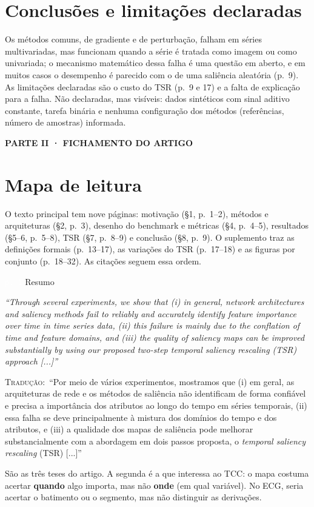 \documentclass[11pt,a4paper]{article}
\newcommand{\pagechip}[1]{{\setlength{\fboxsep}{1.5pt}\colorbox{cAcc}{\textcolor{white}{\scriptsize\texttt{#1}}}}}
\newcommand{\partbar}[1]{\par\vspace{1.2em}\noindent\colorbox{black!80}{\parbox{\dimexpr\linewidth-2\fboxsep}{\color{white}\bfseries\sffamily\MakeUppercase{#1}}}\par\vspace{0.4em}}
\newenvironment{origquote}{\par\itshape\small}{\par}
\newenvironment{tradquote}{\par\small\textsc{Tradução:}\ }{\par}
\newcommand{\explab}[1]{\par\smallskip{\small\color{cAcc}\textbf{\MakeUppercase{#1}}}\par}
\begin{document}
\section{Conclusões e limitações declaradas}
Os métodos comuns, de gradiente e de perturbação, falham em séries multivariadas, mas funcionam quando a série é tratada como imagem ou como univariada; o mecanismo matemático dessa falha é uma questão em aberto, e em muitos casos o desempenho é parecido com o de uma saliência aleatória (p.~9). As limitações declaradas são o custo do TSR (p.~9 e 17) e a falta de explicação para a falha. Não declaradas, mas visíveis: dados sintéticos com sinal aditivo constante, tarefa binária e nenhuma configuração dos métodos (referências, número de amostras) informada.

\partbar{Parte II · Fichamento do artigo}

\section{Mapa de leitura}
O texto principal tem nove páginas: motivação (§1, p.~1--2), métodos e arquiteturas (§2, p.~3), desenho do benchmark e métricas (§4, p.~4--5), resultados (§5--6, p.~5--8), TSR (§7, p.~8--9) e conclusão (§8, p.~9). O suplemento traz as definições formais (p.~13--17), as variações do TSR (p.~17--18) e as figuras por conjunto (p.~18--32). As citações seguem essa ordem.

\begin{citacard}{\pagechip{p. 1} Resumo}
\begin{origquote}“Through several experiments, we show that (i) in general, network architectures and saliency methods fail to reliably and accurately identify feature importance over time in time series data, (ii) this failure is mainly due to the conflation of time and feature domains, and (iii) the quality of saliency maps can be improved substantially by using our proposed two-step temporal saliency rescaling (TSR) approach [...]”\end{origquote}
\begin{tradquote}“Por meio de vários experimentos, mostramos que (i) em geral, as arquiteturas de rede e os métodos de saliência não identificam de forma confiável e precisa a importância dos atributos ao longo do tempo em séries temporais, (ii) essa falha se deve principalmente à mistura dos domínios do tempo e dos atributos, e (iii) a qualidade dos mapas de saliência pode melhorar substancialmente com a abordagem em dois passos proposta, o \textit{temporal saliency rescaling} (TSR) [...]”\end{tradquote}
\explab{Explicação}
São as três teses do artigo. A segunda é a que interessa ao TCC: o mapa costuma acertar \textbf{quando} algo importa, mas não \textbf{onde} (em qual variável). No ECG, seria acertar o batimento ou o segmento, mas não distinguir as derivações.
\end{citacard}
\end{document}
